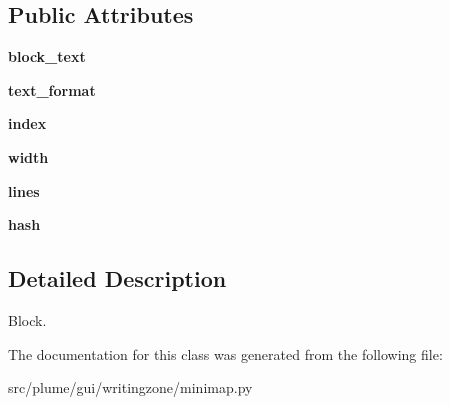 \subsection*{Public Attributes}
\begin{DoxyCompactItemize}
\item 
{\bfseries block\+\_\+text}\hypertarget{classplume-creator_1_1src_1_1plume_1_1gui_1_1writingzone_1_1minimap_1_1_doc_item_a94ef374ae7e5f4ef265a6cf4ae1e946a}{}\label{classplume-creator_1_1src_1_1plume_1_1gui_1_1writingzone_1_1minimap_1_1_doc_item_a94ef374ae7e5f4ef265a6cf4ae1e946a}

\item 
{\bfseries text\+\_\+format}\hypertarget{classplume-creator_1_1src_1_1plume_1_1gui_1_1writingzone_1_1minimap_1_1_doc_item_aa5568770b7d1049c24ea7774d79e7f07}{}\label{classplume-creator_1_1src_1_1plume_1_1gui_1_1writingzone_1_1minimap_1_1_doc_item_aa5568770b7d1049c24ea7774d79e7f07}

\item 
{\bfseries index}\hypertarget{classplume-creator_1_1src_1_1plume_1_1gui_1_1writingzone_1_1minimap_1_1_doc_item_a28a33e8f99878d00ac8ba7149678bc69}{}\label{classplume-creator_1_1src_1_1plume_1_1gui_1_1writingzone_1_1minimap_1_1_doc_item_a28a33e8f99878d00ac8ba7149678bc69}

\item 
{\bfseries width}\hypertarget{classplume-creator_1_1src_1_1plume_1_1gui_1_1writingzone_1_1minimap_1_1_doc_item_af9f3d20109ec5edc4c51b35604a0173c}{}\label{classplume-creator_1_1src_1_1plume_1_1gui_1_1writingzone_1_1minimap_1_1_doc_item_af9f3d20109ec5edc4c51b35604a0173c}

\item 
{\bfseries lines}\hypertarget{classplume-creator_1_1src_1_1plume_1_1gui_1_1writingzone_1_1minimap_1_1_doc_item_a080b008c4d88db3aec4400b515c2f76d}{}\label{classplume-creator_1_1src_1_1plume_1_1gui_1_1writingzone_1_1minimap_1_1_doc_item_a080b008c4d88db3aec4400b515c2f76d}

\item 
{\bfseries hash}\hypertarget{classplume-creator_1_1src_1_1plume_1_1gui_1_1writingzone_1_1minimap_1_1_doc_item_aaf8ba75f35de70a79e55832f54cf5dfc}{}\label{classplume-creator_1_1src_1_1plume_1_1gui_1_1writingzone_1_1minimap_1_1_doc_item_aaf8ba75f35de70a79e55832f54cf5dfc}

\end{DoxyCompactItemize}


\subsection{Detailed Description}
Block. 

The documentation for this class was generated from the following file\+:\begin{DoxyCompactItemize}
\item 
src/plume/gui/writingzone/minimap.\+py\end{DoxyCompactItemize}
